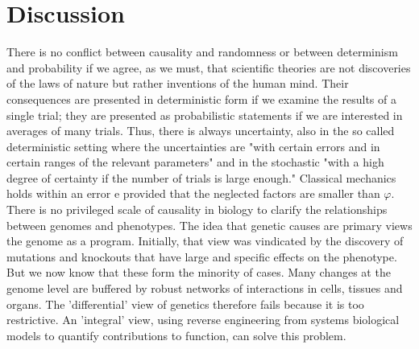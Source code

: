 \documentclass[onecollarge,runningheads]{svjour2}
\begin{document}
\section{Discussion}
There is no conflict between causality and randomness or between determinism and probability if we agree, as we must, that scientific theories are not discoveries of the laws of nature but rather inventions of the human mind. Their consequences are presented in deterministic form if we examine the results of a single trial; they are presented as probabilistic statements if we are interested in averages of many trials. Thus, there is always uncertainty, also in the so called deterministic setting where the uncertainties are "with certain errors and in certain ranges of the relevant parameters" and in the stochastic "with a high degree of certainty if the number of trials is large enough." Classical mechanics holds within an error e provided that the neglected factors are smaller than $\varphi$.
There is no privileged scale of causality in biology to clarify the relationships between genomes and phenotypes.  The idea that genetic causes are primary views the genome as a program. Initially, that view was vindicated by the discovery of mutations and knockouts that have large and specific effects on the phenotype. But we now know that these form the minority of cases. Many changes at the genome level are buffered by robust networks of interactions in cells, tissues and organs.  The 'differential' view of genetics therefore fails because it is too restrictive. An 'integral' view, using reverse engineering from systems biological models to quantify contributions to function, can solve this problem. %
\end{document}
